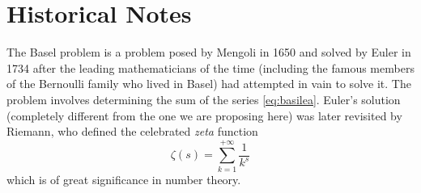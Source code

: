 \section{Historical Notes}

\label{note:Basilea}%
The Basel problem is a problem posed by Mengoli in 1650 and solved by Euler in
1734 after the leading mathematicians of the time (including the famous members
of the Bernoulli family who lived in Basel) had attempted in vain to solve it.
The problem involves determining the sum of the series \eqref{eq:basilea}.
Euler's solution (completely different from the one we are proposing here) was
later revisited by Riemann, who defined the celebrated \emph{zeta} function
%
%
%
%
%
%
\[
\zeta(s) = \sum_{k=1}^{+\infty} \frac{1}{k^s}  
\]
which is of great significance in number theory.